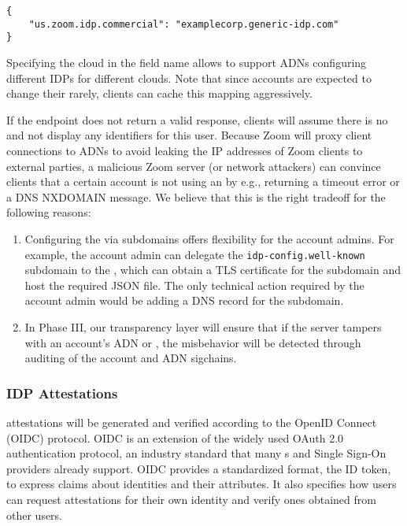 \begin{Verbatim}
{
    "us.zoom.idp.commercial": "examplecorp.generic-idp.com"
}
\end{Verbatim}

Specifying the cloud in the field name allows to support ADNs configuring different IDPs for different clouds. Note that
since accounts are expected to change their \idp rarely, clients can cache this mapping aggressively.

If the endpoint does not return a valid response, clients will assume there is no \idp and not
display any identifiers for this user. Because Zoom will proxy client connections to ADNs to avoid
leaking the IP addresses of Zoom clients to external parties, a malicious Zoom server (or network
attackers) can convince clients that a certain account is not using an \idp by e.g., returning a
timeout error or a DNS NXDOMAIN message. We believe that this is the right tradeoff for the
following reasons:

\begin{enumerate}
\item Configuring the \idp via subdomains offers flexibility for the account admins. For example,
    the account admin can delegate the \texttt{idp-config.well-known} subdomain to the \idp, which
    can obtain a TLS certificate for the subdomain and host the required JSON file. The only
    technical action required by the account admin would be adding a DNS record for the
    subdomain.
\item In Phase III, our transparency layer will ensure that if the server tampers with an account’s
    ADN or \idp, the misbehavior will be detected through auditing of the account and ADN sigchains.
\end{enumerate}

\subsubsection{IDP Attestations}

\idp attestations will be generated and verified according to the OpenID Connect (OIDC) protocol.
OIDC is an extension of the widely used OAuth 2.0 authentication protocol, an industry standard that
many {\idp}s and Single Sign-On providers already support. OIDC provides a standardized format, the
ID token, to express claims about identities and their attributes. It also specifies how users can
request attestations for their own identity and verify ones obtained from other users.

